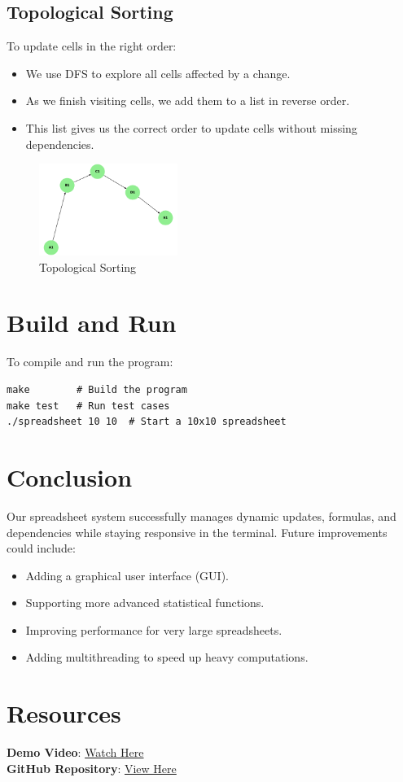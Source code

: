 \documentclass{article}
\begin{document}
\subsection{Topological Sorting}
To update cells in the right order:
\begin{itemize}
    \item We use DFS to explore all cells affected by a change.
    \item As we finish visiting cells, we add them to a list in reverse order.
    \item This list gives us the correct order to update cells without missing dependencies.
\end{itemize}
\begin{figure}[h]
    \centering
    \includegraphics[width=0.4\textwidth]{topological_sorting.png}
    \caption{Topological Sorting}
\end{figure}

\section{Build and Run}
To compile and run the program:
\begin{lstlisting}
make        # Build the program
make test   # Run test cases
./spreadsheet 10 10  # Start a 10x10 spreadsheet
\end{lstlisting}

\section{Conclusion}
Our spreadsheet system successfully manages dynamic updates, formulas, and dependencies while staying responsive in the terminal. Future improvements could include:
\begin{itemize}
    \item Adding a graphical user interface (GUI).
    \item Supporting more advanced statistical functions.
    \item Improving performance for very large spreadsheets.
    \item Adding multithreading to speed up heavy computations.
\end{itemize}

\section{Resources}
\textbf{Demo Video}: \href{https://example.com/demo}{Watch Here}\\
\textbf{GitHub Repository}: \href{https://github.com/example/repo}{View Here}
\end{document}
